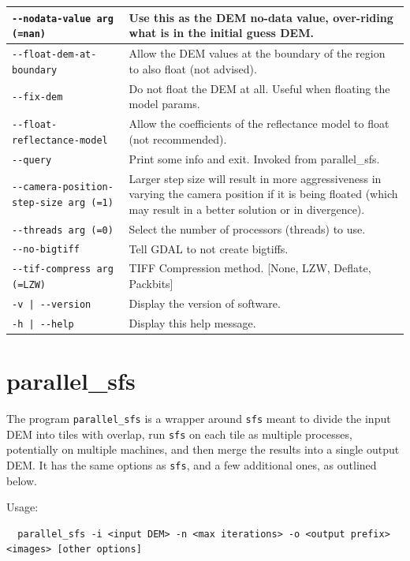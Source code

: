 \begin{longtable}{|l|p{7.5cm}|}
\texttt{-\/-nodata-value arg (=nan)} & Use this as the DEM no-data value, over-riding what is in the initial guess DEM.\\ \hline
\texttt{-\/-float-dem-at-boundary} & Allow the DEM values at the boundary of the region to also float (not advised).\\ \hline
\texttt{-\/-fix-dem} & Do not float the DEM at all. Useful when floating the model params.\\ \hline
\texttt{-\/-float-reflectance-model} & Allow the coefficients of the reflectance model to float (not recommended).\\ \hline
\texttt{-\/-query} & Print some info and exit. Invoked from parallel\_sfs.\\ \hline
\texttt{-\/-camera-position-step-size arg (=1)} & Larger step size will result in more aggressiveness in varying the camera position if it is being floated (which may result in a better solution or in divergence).\\ \hline
\texttt{-\/-threads arg (=0)} & Select the number of processors (threads) to use.\\ \hline
\texttt{-\/-no-bigtiff} & Tell GDAL to not create bigtiffs.\\ \hline
\texttt{-\/-tif-compress arg (=LZW)} & TIFF Compression method. [None, LZW, Deflate, Packbits]\\ \hline
\texttt{-v | -\/-version } & Display the version of software.\\ \hline
\texttt{-h | -\/-help } & Display this help message.\\ \hline
\end{longtable}

\section{parallel\_sfs}
\label{psfs}

The program \texttt{parallel\_sfs} is a wrapper around \texttt{sfs}
meant to divide the input DEM into tiles with overlap, run \texttt{sfs} 
on each tile as multiple processes, potentially on multiple machines,
and then merge the results into a single output DEM. It has the same
options as \texttt{sfs}, and a few additional ones, as outlined below.

Usage:
\begin{verbatim}
  parallel_sfs -i <input DEM> -n <max iterations> -o <output prefix> <images> [other options]
\end{verbatim}


